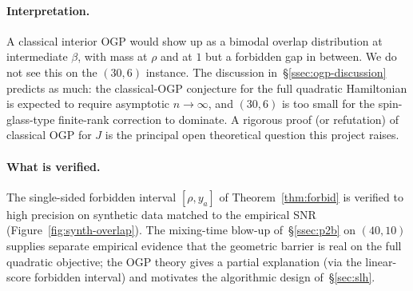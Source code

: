 \paragraph{Interpretation.} A classical interior OGP would show up as a bimodal
overlap distribution at intermediate $\beta$, with mass at $\rho$ and at $1$ but a
forbidden gap in between. We do not see this on the $(30,6)$ instance. The discussion
in~\S\ref{ssec:ogp-discussion} predicts as much: the classical-OGP conjecture for the
full quadratic Hamiltonian is expected to require asymptotic $n\to\infty$, and $(30,6)$
is too small for the spin-glass-type finite-rank correction to dominate. A rigorous
proof (or refutation) of classical OGP for $J$ is the principal open theoretical
question this project raises.

\paragraph{What is verified.} The single-sided forbidden interval $[\rho, y_a]$ of
Theorem~\ref{thm:forbid} is verified to high precision on synthetic data matched to
the empirical SNR (Figure~\ref{fig:synth-overlap}). The mixing-time blow-up
of~\S\ref{ssec:p2b} on $(40,10)$ supplies separate empirical evidence that the
geometric barrier is real on the full quadratic objective; the OGP theory gives a
partial explanation (via the linear-score forbidden interval) and motivates the
algorithmic design of~\S\ref{sec:slh}.

